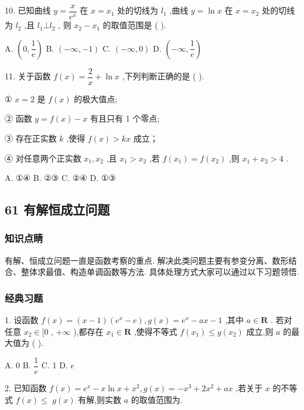 10. 已知曲线 $y = \dfrac{x}{{{e}}^{x}}$ 在 $x = {x}_{1}$ 处的切线为 ${l}_{1}$ ,曲线 $y = \ln x$ 在 $x = {x}_{2}$ 处的切线为 ${l}_{2}$ ,且 ${l}_{1}\bot {l}_{2}$ , 则 ${x}_{2} - {x}_{1}$ 的取值范围是 (   ).

A. $\left( {0,\dfrac{1}{{e}}}\right)$ B. $\left( {-\infty , - 1}\right)$ C. $\left( {-\infty ,0}\right)$ D. $\left( {-\infty ,\dfrac{1}{{e}}}\right)$

11. 关于函数 $f\left( x\right)  = \dfrac{2}{x} + \ln x$ ,下列判断正确的是 (   ).

① $x = 2$ 是 $f\left( x\right)$ 的极大值点;

② 函数 $y = f\left( x\right)  - x$ 有且只有 1 个零点;

③ 存在正实数 $k$ ,使得 $f\left( x\right)  > {kx}$ 成立；

④ 对任意两个正实数 ${x}_{1},{x}_{2}$ ,且 ${x}_{1} > {x}_{2}$ ,若 $f\left( {x}_{1}\right)  = f\left( {x}_{2}\right)$ ,则 ${x}_{1} + {x}_{2} > 4$ .

A. ①④ B. ②③ C. ②④ D. ①③

\subsection*{61 有解恒成立问题}

\subsubsection*{知识点睛}

有解、恒成立问题一直是函数考察的重点. 解决此类问题主要有参变分离、数形结合、整体求最值、构造单调函数等方法. 具体处理方式大家可以通过以下习题领悟.

\subsubsection*{经典习题}

1. 设函数 $f\left( x\right)  = \left( {x - 1}\right) \left( {{{e}}^{x} - {e}}\right) ,g\left( x\right)  = {{e}}^{x} - {ax} - 1$ ,其中 $a \in  \mathbf{R}$ . 若对任意 ${x}_{2} \in  \lbrack 0$ , $+ \infty$ ),都存在 ${x}_{1} \in  \mathbf{R}$ ,使得不等式 $f\left( {x}_{1}\right)  \leq  g\left( {x}_{2}\right)$ 成立,则 $a$ 的最大值为 (   ).

A. 0 B. $\dfrac{1}{{e}}$ C. 1 D. ${e}$

2. 已知函数 $f\left( x\right)  = {{e}}^{x} - x\ln x + {x}^{2},g\left( x\right)  =  - {x}^{3} + 2{x}^{2} + {ax}$ ,若关于 $x$ 的不等式 $f\left( x\right)  \leq$  $g\left( x\right)$ 有解,则实数 $a$ 的取值范围为\blkda{}.

